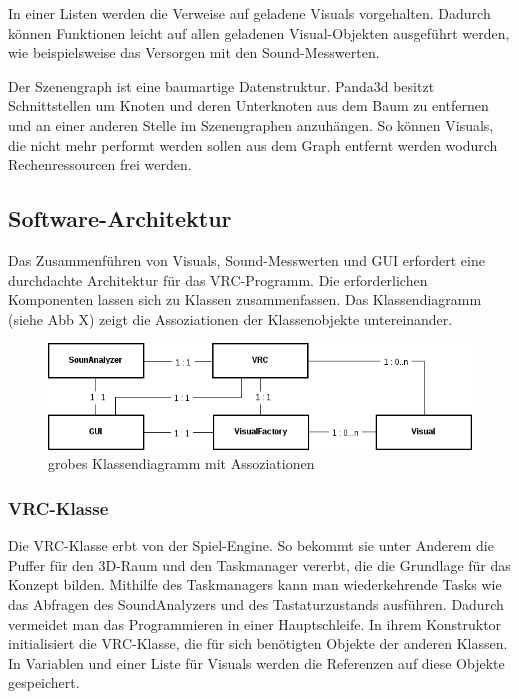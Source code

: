 In einer Listen werden die Verweise auf geladene Visuals vorgehalten. Dadurch k\"onnen Funktionen leicht auf allen
geladenen Visual-Objekten ausgef\"uhrt werden, wie beispielsweise das Versorgen mit den Sound-Messwerten.

Der Szenengraph ist eine baumartige Datenstruktur. Panda3d besitzt Schnittstellen um Knoten und deren Unterknoten
aus dem Baum zu entfernen und an einer anderen Stelle im Szenengraphen anzuh\"angen. So k\"onnen Visuals, die nicht mehr
performt werden sollen aus dem Graph entfernt werden wodurch Rechenressourcen frei werden.

\subsection{Software-Architektur}

Das Zusammenf\"uhren von Visuals, Sound-Messwerten und GUI erfordert eine durchdachte Architektur f\"ur das VRC-Programm.
Die erforderlichen Komponenten lassen sich zu Klassen zusammenfassen. Das Klassendiagramm (siehe Abb X) zeigt die
Assoziationen der Klassenobjekte untereinander.

\begin{figure}[h!]
    \centering
    \includegraphics[width=1\textwidth]{pictures/classdiagram1.png}
    \caption{grobes Klassendiagramm mit Assoziationen}
\end{figure}

\subsubsection{VRC-Klasse}

Die VRC-Klasse erbt von der Spiel-Engine. So bekommt sie unter Anderem die Puffer f\"ur den 3D-Raum und den Taskmanager
vererbt, die die Grundlage f\"ur das Konzept bilden. Mithilfe des Taskmanagers kann man wiederkehrende Tasks wie
das Abfragen des SoundAnalyzers und des Tastaturzustands ausf\"uhren. Dadurch vermeidet man das Programmieren in einer
Hauptschleife.
In ihrem Konstruktor initialisiert die VRC-Klasse, die f\"ur sich ben\"otigten Objekte der anderen Klassen.
In Variablen und einer Liste f\"ur Visuals werden die Referenzen auf diese Objekte gespeichert.

